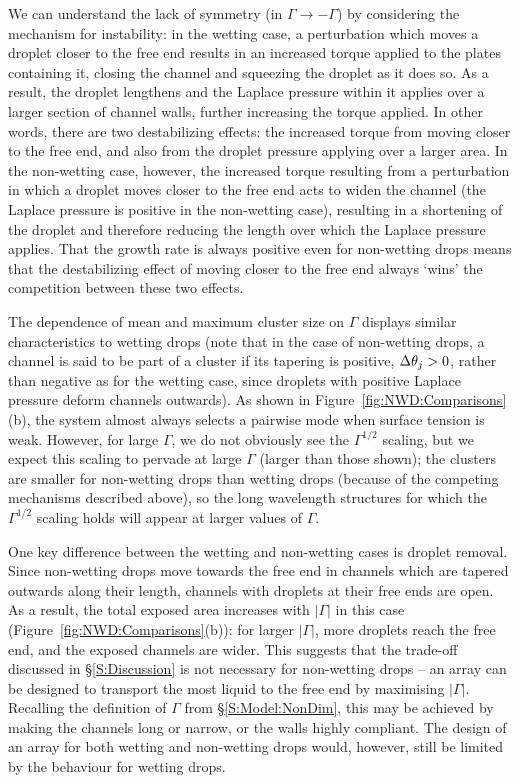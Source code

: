We can understand the lack of symmetry (in $\Gamma \to -\Gamma$) by considering the mechanism for instability:  in the wetting case, a perturbation which moves a droplet closer to the free end results in an increased torque applied to the plates containing it, closing the channel and squeezing the droplet as it does so. As a result, the droplet lengthens and the Laplace pressure within it applies over a larger section of channel walls, further increasing the torque applied. In other words, there are two destabilizing effects: the increased torque from moving closer to the free end, and also from the droplet pressure applying over a larger area. In the non-wetting case, however, the increased torque resulting from a perturbation in which a droplet moves closer to the free end acts to widen the channel (the Laplace pressure is positive in the non-wetting case), resulting in a shortening of the droplet and therefore reducing the length over which the Laplace pressure applies. That the growth rate is always positive even for non-wetting drops means that the destabilizing effect of moving closer to the free end always `wins' the competition between these two effects.

The dependence of mean and maximum cluster size on $\Gamma$ displays similar characteristics to wetting drops (note that in the case of non-wetting drops, a channel is said to be part of a cluster if its tapering is positive, $\Delta \theta_j >0$, rather than negative as for the wetting case, since droplets with positive Laplace pressure deform channels outwards). As shown in Figure~\ref{fig:NWD:Comparisons}(b), the system almost always selects a pairwise mode when surface tension is weak. However, for large $\Gamma$, we do not obviously see the $\Gamma^{1/2}$ scaling, but we expect this scaling to pervade at large $\Gamma$ (larger than those shown); the clusters are smaller for non-wetting drops than wetting drops (because of the competing mechanisms described above), so the long wavelength structures for which the $\Gamma^{1/2}$ scaling holds will appear at larger values of $\Gamma$.

One key difference between the wetting and non-wetting cases is droplet removal. Since non-wetting drops move towards the free end in channels which are tapered outwards along their length, channels with droplets at their free ends are open. As a result, the total exposed area increases with $|\Gamma|$ in this case (Figure~\ref{fig:NWD:Comparisons}(b)): for larger $|\Gamma|$, more droplets reach the free end, and the exposed channels are wider. This suggests that the trade-off discussed in \S\ref{S:Discussion} is not necessary for non-wetting drops -- an array can be designed to transport the most liquid to the free end by maximising $|\Gamma|$. Recalling the definition of $\Gamma$ from \S\ref{S:Model:NonDim}, this may be achieved by making the channels long or narrow, or the walls highly compliant. The design of an array for both wetting and non-wetting drops would, however, still be limited by the behaviour for wetting drops.

